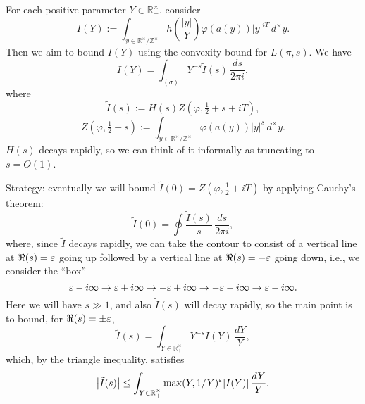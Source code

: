 \documentclass[reqno]{amsart} 
\begin{document}
For each positive parameter $Y \in \mathbb{R}^\times_+$, consider
\begin{equation*}
  I(Y) :=
  \int _{y \in \mathbb{R}^\times / \mathbb{Z} ^\times }
  h \left( \frac{\lvert y \rvert}{Y} \right)
  \varphi(a(y)) |y|^{i T} \, d^\times y.
\end{equation*}
Then we aim to bound $I(Y)$ using the convexity bound for $L(\pi,s)$.  We have
\begin{equation}\label{eqn:cool-integral-rep-of-I-of-Y}
  I (Y) = \int _{(\sigma)} Y^{-s} \tilde{I}(s)
  \, \frac{d s}{2 \pi i},
\end{equation}
where
\begin{equation*}
  \tilde{I}(s)
  :=H(s)
    Z(\varphi,\tfrac{1}{2} + s+ iT),
\end{equation*}
\begin{equation*}
  Z(\varphi,\tfrac{1}{2} + s) := \int _{y \in \mathbb{R}^\times / \mathbb{Z}^\times } \varphi (a (y)) \lvert y \rvert ^s \, d^\times y.
\end{equation*}
$H(s)$ decays rapidly, so we can think of it informally as truncating to $s = O(1)$.

Strategy: eventually we will bound $\tilde{I}(0) = Z(\varphi, \tfrac{1}{2} + i T)$ by applying Cauchy's theorem:
\begin{equation*}
  \tilde{I}(0)
  =
  \oint \frac{\tilde{I}(s)}{s} \, \frac{d s }{2 \pi i},
\end{equation*}
where, since $\tilde{I}$ decays rapidly, we can take the contour to consist of a vertical line at $\Re(s) = \varepsilon$ going up followed by a vertical line at $\Re(s) = - \varepsilon$ going down, i.e., we consider the ``box''
\begin{equation*}
  \varepsilon - i \infty \rightarrow \varepsilon + i \infty \rightarrow - \varepsilon + i \infty \rightarrow - \varepsilon - i \infty \rightarrow \varepsilon - i \infty.
\end{equation*}
Here we will have $s \gg 1$, and also $\tilde{I}(s)$ will decay rapidly, so the main point is to bound, for $\Re(s) = \pm \varepsilon$,
\begin{equation*}
  \tilde{I}(s) = \int _{Y \in \mathbb{R}^\times_+} Y^{-s} I(Y) \, \frac{d Y }{ Y},
\end{equation*}
which, by the triangle inequality, satisfies
\begin{equation*}
  \left\lvert \tilde{I}(s) \right\rvert \leq \int _{Y \in \mathbb{R}^\times_+}
  \max(Y,1/Y)^{\varepsilon} \lvert I(Y) \rvert \, \frac{d Y }{Y}.
\end{equation*}
\end{document}
